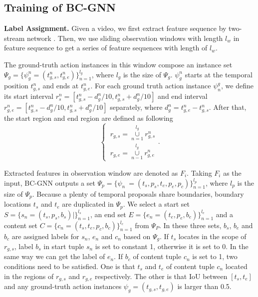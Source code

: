 \documentclass[runningheads]{llncs}
\begin{document}
\subsection{Training of BC-GNN}

\noindent\textbf{Label Assignment.}
Given a video, we first extract feature sequence by two-stream network \cite{two-stream}. Then, we use sliding observation windows with length $l_w$ in feature sequence to get a series of feature sequences with length of $l_w$.

The ground-truth action instances in this window compose an instance set
$ \Psi_g = \{ \psi_g^n = (t_{g,s}^n, t_{g, e}^n)\}_{n=1}^{l_g} $, where $l_g$ is the size of $\Psi_g$. $\psi_g^n$ starts at the temporal position $t_{g,s}^n$ and ends at $t_{g,e}^n$. For each ground truth action instance $\psi_n^g $, we define its start interval $r_{s}^n = [t_{g,s}^n - d_g^n/10, t_{g, s}^n + d_g^n /10]$ and end interval $r_{g, e}^n = [t_{g,s}^n - d_g^n/10, t_{g, s}^n + d_g^n/10]$ separately, where $d_g^n = t_{g,e}^n - t_{g, s}^n$. After that, the start region and end region are defined as following
\begin{equation}
\begin{cases}
\ r_{g,s} = \mathop{\cup}\limits_{n=1}^{l_g} r_{g,s}^n
\\
\ r_{g,e} = \mathop{\cup}\limits_{n-1}^{l_g} r_{g,e} ^n
\end{cases}
.
\end{equation}


Extracted features in observation window are denoted as $F_i$. Taking $F_i$ as the input, BC-GNN outputs a set $\Psi_p = \{
\psi_n\ =
(t_{s}, p_{s}, t_{e}, p_{e}, p_{c})
\}_{n=1}^{l_p}$, where $l_p$ is the size of $\Psi_p$. Because a plenty of temporal proposals share boundaries, boundary locations $t_s$ and $t_e$ are duplicated in $\Psi_p$. We select a start set $S = \{s_n=(t_s, p_s, b_{s})|\}_{n=1}^{l_s}$, an end set $E = \{e_n=(t_e, p_e, b_e)\}_{n=1}^{l_e}$ and a content set $C =\{c_n = (t_{s}, t_{e}, p_{c}, b_c)\}_{n=1}^{l_c}$ from $\Psi_P$. In these three sets, $b_s$, $b_e$ and $b_c$ are assigned labels for $s_n$, $e_n$ and $c_n$ based on $\Psi_g$. If $t_s$ locates in the scope of $r_{g,s}$, label $b_s$ in start tuple $s_n$ is set to constant 1, otherwise it is set to 0. In the same way we can get the label of $e_n$. If $b_c$ of content tuple $c_n$ is set to 1, two conditions need to be satisfied. One is that $t_s$ and $t_e$ of content tuple $c_n$ located in the regions of $r_{g,s}$ and $r_{g,e}$ respectively. The other is that IoU between $[t_s, t_e]$ and any ground-truth action instances $\psi_g = (t_{g,s}, t_{g, e})$ is larger than 0.5.
\end{document}
